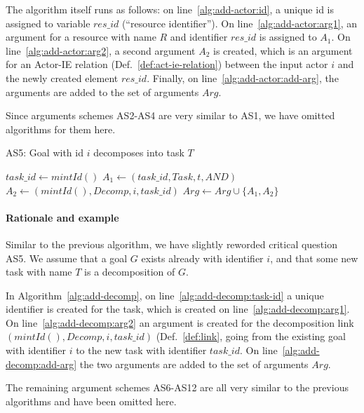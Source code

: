 The algorithm itself runs as follows: on line~\ref{alg:add-actor:id}, a unique id is assigned to variable $res\_id$ (``resource identifier''). On line~\ref{alg:add-actor:arg1}, an argument for a resource with name $R$ and identifier $res\_id$ is assigned to $A_1$. On line~\ref{alg:add-actor:arg2}, a second argument $A_2$ is created, which is an argument for an Actor-IE relation (Def.~\ref{def:act-ie-relation}) between the input actor $i$ and the newly created element $res\_id$. Finally, on line~\ref{alg:add-actor:add-arg}, the arguments are added to the set of arguments $Arg$.

Since arguments schemes AS2-AS4 are very similar to AS1, we have omitted algorithms for them here.

\begin{algorithm}[h]
  \caption{AS5: Goal with id $i$ decomposes into task $T$}\label{alg:add-decomp}
  \begin{algorithmic}[1]
    \State $task\_id\gets mintId()$\label{alg:add-decomp:task-id}
    \State $A_1\leftarrow (task\_id, Task, t, AND)$\label{alg:add-decomp:arg1}
    \State $A_2\leftarrow (mintId(), Decomp, i, task\_id)$\label{alg:add-decomp:arg2}
    \State $Arg\gets Arg\cup \{A_1,A_2\}$\label{alg:add-decomp:add-arg}
    \EndProcedure
  \end{algorithmic}
\end{algorithm}

\paragraph{Rationale and example} Similar to the previous algorithm, we have slightly reworded critical question AS5. We assume that a goal $G$ exists already with identifier $i$, and that some new task with name $T$ is a decomposition of $G$. 

In Algorithm~\ref{alg:add-decomp}, on line~\ref{alg:add-decomp:task-id} a unique identifier is created for the task, which is created on line~\ref{alg:add-decomp:arg1}. On line~\ref{alg:add-decomp:arg2} an argument is created for the decomposition link $(mintId(), Decomp, i, task\_id)$ (Def.~\ref{def:link}, going from the existing goal with identifier $i$ to the new task with identifier $task\_id$. On line~\ref{alg:add-decomp:add-arg} the two arguments are added to the set of arguments $Arg$.

The remaining argument schemes AS6-AS12 are all very similar to the previous algorithms and have been omitted here.

